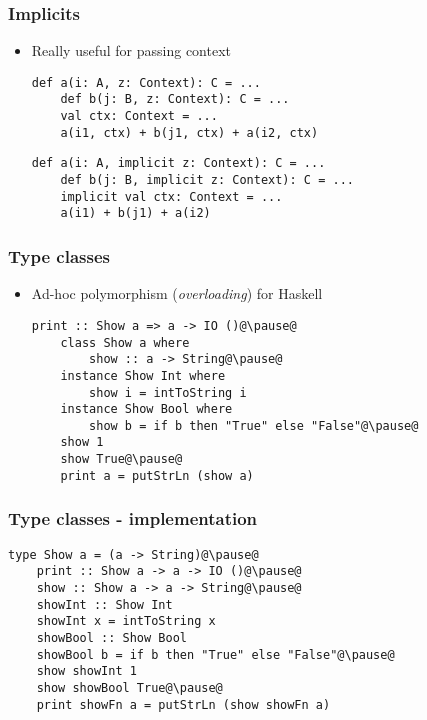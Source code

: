 \begin{frame}[fragile]
    \frametitle{Implicits}
    \begin{itemize}
        \item Really useful for passing context \\
        \begin{overprint}
        \begin{lstlisting}[mathescape]
    def a(i: A, z: Context): C = ...
    def b(j: B, z: Context): C = ...
    val ctx: Context = ...
    a(i1, ctx) + b(j1, ctx) + a(i2, ctx)
        \end{lstlisting}
        \begin{lstlisting}[mathescape]
    def a(i: A, implicit z: Context): C = ...
    def b(j: B, implicit z: Context): C = ...
    implicit val ctx: Context = ...
    a(i1) + b(j1) + a(i2)
        \end{lstlisting}
        \end{overprint}
    \end{itemize}
\end{frame}

\begin{frame}[fragile]
    \frametitle{Type classes}
    \begin{itemize}
        \pause
        \item Ad-hoc polymorphism (\emph{overloading}) for Haskell \\
        \pause
        \begin{lstlisting}[mathescape]
    print :: Show a => a -> IO ()@\pause@
    class Show a where
        show :: a -> String@\pause@
    instance Show Int where
        show i = intToString i
    instance Show Bool where
        show b = if b then "True" else "False"@\pause@
    show 1
    show True@\pause@
    print a = putStrLn (show a)
        \end{lstlisting}
    \end{itemize}
\end{frame}

\begin{frame}[fragile]
    \frametitle{Type classes - implementation}
    \pause
        \begin{lstlisting}[mathescape]
    type Show a = (a -> String)@\pause@
    print :: Show a -> a -> IO ()@\pause@
    show :: Show a -> a -> String@\pause@
    showInt :: Show Int
    showInt x = intToString x
    showBool :: Show Bool
    showBool b = if b then "True" else "False"@\pause@
    show showInt 1
    show showBool True@\pause@
    print showFn a = putStrLn (show showFn a)
        \end{lstlisting}
\end{frame}

